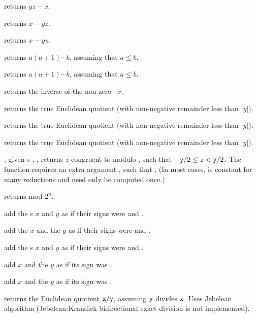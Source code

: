  returns $yz - x$.

 returns $x - yz$.

 returns $x -yu$.

 returns $a(a+1)\cdots b$, assuming
that $a \leq b$.

 returns $a(a+1)\cdots b$, assuming
that $a \leq b$.

 returns the inverse of the non-zero ~$x$.

 returns the true Euclidean quotient
(with non-negative remainder less than $|y|$).

 returns the true Euclidean quotient
(with non-negative remainder less than $|y|$).

 returns the true Euclidean quotient
(with non-negative remainder less than $|y|$).

, given
s , , returns $z$ congruent to  modulo ,
such that $-{\tt y}/2 \leq z < {\tt y}/2$. The function requires an extra
argument , such that . (In most cases, 
is constant for many reductions and  need only be computed once.)

 returns  mod $2^n$.

 add the s
$x$ and $y$ as if their signs were  and .

add the  $x$ and the  $y$ as if their signs were 
and .

 add the s $x$
and $y$ as if their signs were  and .

 add $x$ and the  $y$
as if its sign was .

 add $x$ and the  $y$
as if its sign was .


 returns the Euclidean quotient
${\tt x} / {\tt y}$, assuming ${\tt y}$ divides ${\tt x}$. Uses Jebelean
algorithm (Jebelean-Krandick bidirectional exact division is not
implemented).

